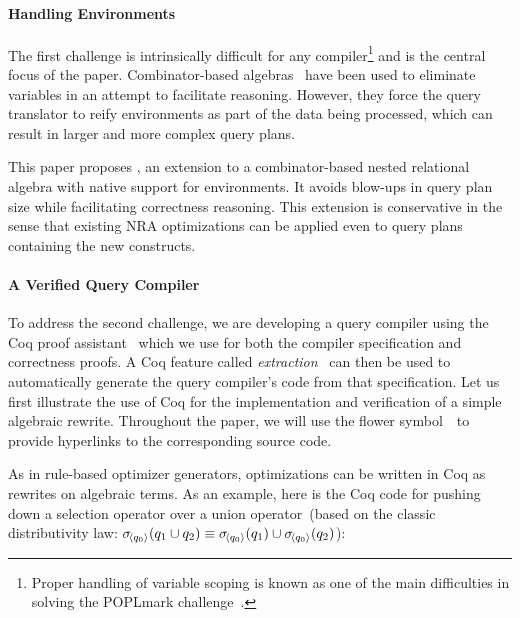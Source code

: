 \paragraph*{Handling Environments}

The first challenge is intrinsically difficult for any
compiler\footnote{Proper handling of variable scoping is known as one
  of the main difficulties in solving the POPLmark
  challenge~\cite{AydemirBFFPSVWWZ05}.} and is the central focus of
the paper. Combinator-based
algebras~\cite{cherniack1996rule,ShinnarSH15} have been used to
eliminate variables in an attempt to facilitate reasoning.  However,
they force the query translator to reify environments as part of the
data being processed, which can result in larger and more complex
query plans.

This paper proposes \NRAEnv, an extension to a combinator-based nested
relational algebra with native support for environments.  It avoids
blow-ups in query plan size while facilitating correctness
reasoning. This extension is conservative in the sense that existing
NRA optimizations can be applied even to query plans containing the
new constructs.

\paragraph*{A Verified Query Compiler}

To address the second challenge, we are developing a query compiler
using the Coq proof assistant~\cite{coq} which we use for both the
compiler specification and correctness proofs. A Coq feature called
\emph{extraction}~\cite{coq:extraction} can then be used to
automatically generate the query compiler's code from that
specification.
%
Let us first illustrate the use of Coq for the implementation and
verification of a simple algebraic rewrite. Throughout the paper, we
will use the flower symbol~\coqtop\ to provide hyperlinks to the
corresponding source code.

As in rule-based optimizer generators, optimizations can be written in
Coq as rewrites on algebraic terms. As an example, here is the Coq
code for pushing down a selection operator over a union
operator~(based on the classic distributivity law:
${\sigma\!_{\left\langle{q_0}\right\rangle}\!\left({q_1 \cup q_2}\right) \equiv \sigma\!_{\left\langle{q_0}\right\rangle}\!\left({q_1}\right) \cup
  {\sigma\!_{\left\langle{q_0}\right\rangle}\!\left({q_2}\right)}}$):

